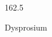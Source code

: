 \documentclass[12pt]{article}
\begin{document}
\hfill{}
\vfill
\begin{center}
  {\fontsize{50}{60}
  }

  \vspace{1em}

  162.5

Dysprosium
\end{center}
\vfill
\end{document}
